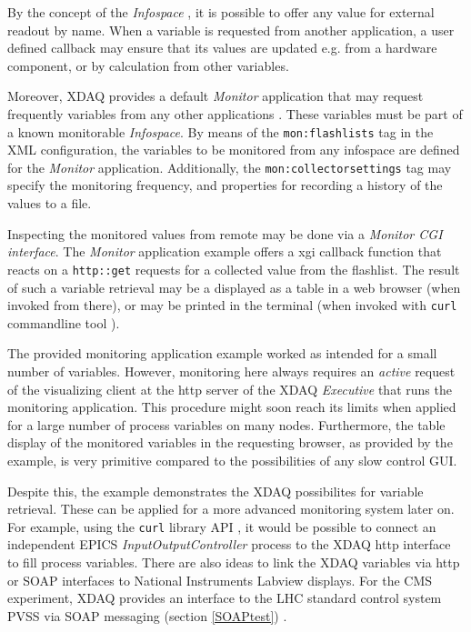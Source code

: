 By the concept of the {\em Infospace} \cite{XDAQ-wiki}, it is possible to offer any value
for external readout by name. When a variable is requested from another
application, a user defined callback may ensure that its values are updated e.g. 
from a hardware component, or by calculation from other variables.

Moreover, XDAQ provides a default  {\em Monitor} application that may
request frequently variables from any other applications \cite{XDAQ-Monitor-wiki}. These variables
must be part of a known monitorable {\em Infospace}. 
By means of the {\tt mon:flashlists} tag in the XML configuration,
the variables to be monitored from any infospace are defined for
the {\em Monitor} application. Additionally, the {\tt mon:collectorsettings}
tag may specify the monitoring frequency, and properties for
recording a history of the values to a file.

Inspecting the monitored values from remote may be done via
a {\em Monitor CGI interface}. The {\em Monitor} application
example offers a xgi callback function that reacts on
a {\tt http::get} requests for a collected value from the flashlist. 
The result of such a variable retrieval may be a displayed as a table
in a web browser (when invoked from there), or may be printed
in the terminal (when invoked with {\tt curl} commandline tool \cite{CURL}).

The provided monitoring application example worked as intended for a small number of variables.
However, monitoring here always requires an {\em active} request of the visualizing client 
at the http server of the XDAQ {\em Executive} that runs the monitoring application.
This procedure might soon reach its limits when applied for a large number of
process variables on many nodes. Furthermore, the table 
display of the monitored variables in the requesting browser, as provided by the example, 
is very primitive compared to the possibilities of any slow control GUI.

Despite this, the example demonstrates the XDAQ possibilites for variable retrieval.
These can be applied for a more advanced monitoring system later on. For example, 
using the {\tt curl} library API \cite{CURL}, it would be possible to connect an independent EPICS 
{\em InputOutputController} process to the XDAQ http interface to fill process variables.
There are also ideas \cite{XDAQ-Monitor-wiki} to link the XDAQ variables via http or SOAP interfaces to National Instruments Labview  \cite{Labview} displays.
For the CMS experiment, XDAQ provides an interface to the LHC 
standard control system PVSS via SOAP messaging (section \ref{SOAPtest}) \cite{XDAQ-wiki}.



